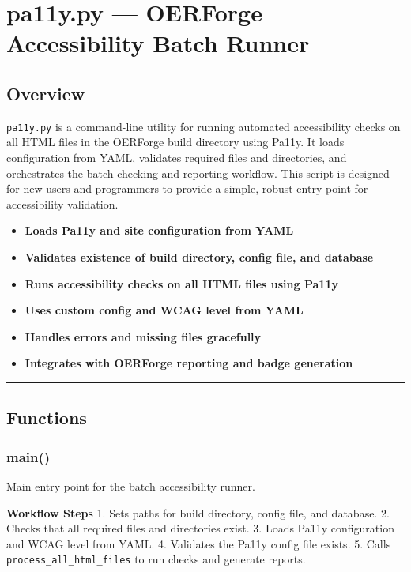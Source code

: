 \section{pa11y.py --- OERForge Accessibility Batch
Runner}\label{pa11y.py-oerforge-accessibility-batch-runner}

\subsection{Overview}\label{overview}

\texttt{pa11y.py} is a command-line utility for running automated
accessibility checks on all HTML files in the OERForge build directory
using Pa11y. It loads configuration from YAML, validates required files
and directories, and orchestrates the batch checking and reporting
workflow. This script is designed for new users and programmers to
provide a simple, robust entry point for accessibility validation.

\begin{itemize}
\tightlist
\item
  \textbf{Loads Pa11y and site configuration from YAML}
\item
  \textbf{Validates existence of build directory, config file, and
  database}
\item
  \textbf{Runs accessibility checks on all HTML files using Pa11y}
\item
  \textbf{Uses custom config and WCAG level from YAML}
\item
  \textbf{Handles errors and missing files gracefully}
\item
  \textbf{Integrates with OERForge reporting and badge generation}
\end{itemize}

\begin{center}\rule{0.5\linewidth}{0.5pt}\end{center}

\subsection{Functions}\label{functions}

\subsubsection{main()}\label{main}

Main entry point for the batch accessibility runner.

\textbf{Workflow Steps} 1. Sets paths for build directory, config file,
and database. 2. Checks that all required files and directories exist.
3. Loads Pa11y configuration and WCAG level from YAML. 4. Validates the
Pa11y config file exists. 5. Calls \texttt{process\_all\_html\_files} to
run checks and generate reports.


